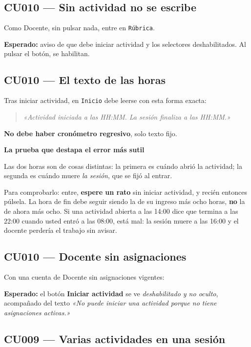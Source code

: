\documentclass[11pt,a4paper]{article}
\newcommand{\ruta}[1]{\textcolor{azulmarino}{\texttt{#1}}}
\newenvironment{aviso}[1]
  {\par\medskip\noindent
   \begin{lrbox}{\cajaaviso}
   \begin{minipage}{\dimexpr\textwidth-2\fboxsep-2\fboxrule\relax}
   \smallskip
   \textbf{\textcolor{ambar}{#1}}\par\smallskip}
  {\smallskip\end{minipage}\end{lrbox}%
   \fcolorbox{ambar}{grisclaro}{\usebox{\cajaaviso}}\par\medskip}
\begin{document}
\subsection{CU010 --- Sin actividad no se escribe}

Como Docente, sin pulsar nada, entre en \ruta{Rúbrica}.

\textbf{Esperado:} aviso de que debe iniciar actividad y los selectores
deshabilitados. Al pulsar el botón, se habilitan.

\subsection{CU010 --- El texto de las horas}

Tras iniciar actividad, en \ruta{Inicio} debe leerse con esta forma exacta:

\begin{quote}
\emph{«Actividad iniciada a las HH:MM. La sesión finaliza a las HH:MM.»}
\end{quote}

\textbf{No debe haber cronómetro regresivo}, solo texto fijo.

\begin{aviso}{La prueba que destapa el error más sutil}
Las dos horas son de cosas distintas: la primera es cuándo abrió la actividad;
la segunda es cuándo muere \emph{la sesión}, que se fijó al entrar.

Para comprobarlo: entre, \textbf{espere un rato} sin iniciar actividad, y recién
entonces púlsela. La hora de fin debe seguir siendo la de su ingreso más ocho
horas, \textbf{no} la de ahora más ocho. Si una actividad abierta a las 14:00
dice que termina a las 22:00 cuando usted entró a las 08:00, está mal: la sesión
muere a las 16:00 y el docente perdería el trabajo sin avisar.
\end{aviso}

\subsection{CU010 --- Docente sin asignaciones}

Con una cuenta de Docente sin asignaciones vigentes:

\textbf{Esperado:} el botón \textbf{Iniciar actividad} se ve \emph{deshabilitado
y no oculto}, acompañado del texto \emph{«No puede iniciar una actividad porque
no tiene asignaciones activas.»}

\subsection{CU009 --- Varias actividades en una sesión}
\end{document}
